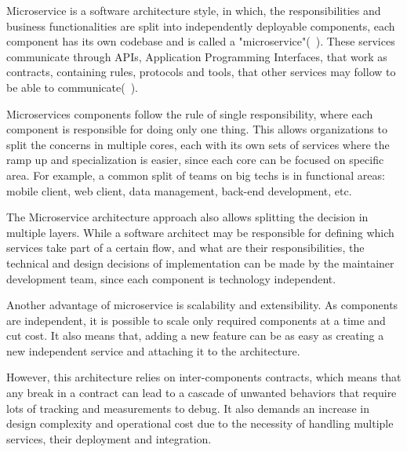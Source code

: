 Microservice is a software architecture style, in which, the responsibilities and business functionalities are split into independently deployable components, each component has its own codebase and is called a "microservice"(~\cite{Micro}). These services communicate through APIs, Application Programming Interfaces, that work as contracts, containing rules, protocols and tools, that other services may follow to be able to communicate(~\cite{Microservices}).

Microservices components follow the rule of single responsibility, where each component is responsible for doing only one thing. This allows organizations to split the concerns in multiple cores, each with its own sets of services where the ramp up and specialization is easier, since each core can be focused on specific area. For example, a common split of teams on big techs is in functional areas: mobile client, web client, data management, back-end development, etc.

The Microservice architecture approach also allows splitting the decision in multiple layers. While a software architect may be responsible for defining which services take part of a certain flow, and what are their responsibilities, the technical and design decisions of implementation can be made by the maintainer development team, since each component is technology independent.

Another advantage of microservice is scalability and extensibility. As components are independent, it is possible to scale only required components at a time and cut cost. It also means that, adding a new feature can be as easy as creating a new independent service and attaching it to the architecture.

However, this architecture relies on inter-components contracts, which means that any break in a contract can lead to a cascade of unwanted behaviors that require lots of tracking and measurements to debug. It also demands an increase in design complexity and operational cost due to the necessity of handling multiple services, their deployment and integration.
